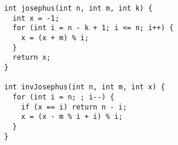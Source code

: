 \begin{lstlisting}
int josephus(int n, int m, int k) {
  int x = -1;
  for (int i = n - k + 1; i <= n; i++) {
    x = (x + m) % i;
  }
  return x;
}

int invJosephus(int n, int m, int x) {
  for (int i = n; ; i--) {
    if (x == i) return n - i;
    x = (x - m % i + i) % i;
  }
}

\end{lstlisting}